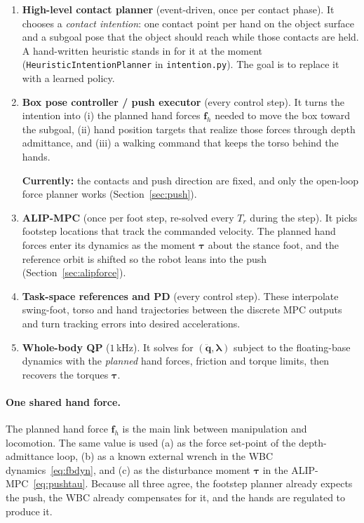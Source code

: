 \documentclass[11pt]{article}
\theoremstyle{remark}
\theoremstyle{definition}
\newcommand{\qdd}{\ddot{\bm{q}}}
\newcommand{\btau}{\bm{\tau}}
\newcommand{\blam}{\bm{\lambda}}
\newcommand{\f}{\bm{f}}
\newcommand{\code}[1]{\texttt{#1}}
\begin{document}
\begin{enumerate}
  \item \textbf{High-level contact planner} (event-driven, once per contact phase). It chooses a \emph{contact
        intention}: one contact point per hand on the object surface and a subgoal pose that the object should reach
        while those contacts are held. A hand-written heuristic stands in for it at the moment
        (\code{HeuristicIntentionPlanner} in \code{intention.py}). The goal is to replace it with a learned policy.
  \item \textbf{Box pose controller / push executor} (every control step). It turns the intention into
        (i) the planned hand forces $\f_h$ needed to move the box toward the subgoal, (ii) hand position targets that
        realize those forces through depth admittance, and (iii) a walking command that keeps the torso behind the
        hands. 
        
        \textbf{Currently:} the contacts and push direction are fixed, and only the open-loop force planner works
        (Section~\ref{sec:push}).
  \item \textbf{ALIP-MPC} (once per foot step, re-solved every $T_r$ during the step). It picks footstep locations that track
        the commanded velocity. The planned hand forces enter its dynamics as the moment $\btau$ about the stance foot,
        and the reference orbit is shifted so the robot leans into the push (Section~\ref{sec:alipforce}).
  \item \textbf{Task-space references and PD} (every control step). These interpolate swing-foot, torso and hand
        trajectories between the discrete MPC outputs and turn tracking errors into desired accelerations.
  \item \textbf{Whole-body QP} ($1\,$kHz). It solves for $(\qdd,\blam)$ subject to the floating-base dynamics with the
        \emph{planned} hand forces, friction and torque limits, then recovers the torques $\btau$.
\end{enumerate}

\paragraph{One shared hand force.} The planned hand force $\f_h$ is the main link between manipulation and locomotion.
The same value is used (a) as the force set-point of the depth-admittance loop, (b) as a known external wrench in the WBC
dynamics~\eqref{eq:fbdyn}, and (c) as the disturbance moment $\btau$ in the ALIP-MPC~\eqref{eq:pushtau}. Because all
three agree, the footstep planner already expects the push, the WBC already compensates for it, and the hands are
regulated to produce it.
\end{document}
